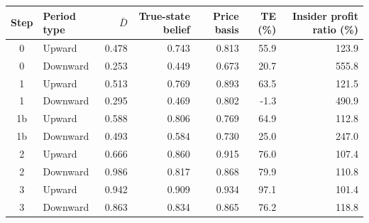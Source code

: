 \begin{tabular}{clrrrrr}
\toprule
Step & Period type & $\bar D$ & True-state belief & Price basis & TE (\%) & Insider profit ratio (\%) \\
\midrule
0 & Upward & 0.478 & 0.743 & 0.813 & 55.9 & 123.9 \\
0 & Downward & 0.253 & 0.449 & 0.673 & 20.7 & 555.8 \\
1 & Upward & 0.513 & 0.769 & 0.893 & 63.5 & 121.5 \\
1 & Downward & 0.295 & 0.469 & 0.802 & -1.3 & 490.9 \\
1b & Upward & 0.588 & 0.806 & 0.769 & 64.9 & 112.8 \\
1b & Downward & 0.493 & 0.584 & 0.730 & 25.0 & 247.0 \\
2 & Upward & 0.666 & 0.860 & 0.915 & 76.0 & 107.4 \\
2 & Downward & 0.986 & 0.817 & 0.868 & 79.9 & 110.8 \\
3 & Upward & 0.942 & 0.909 & 0.934 & 97.1 & 101.4 \\
3 & Downward & 0.863 & 0.834 & 0.865 & 76.2 & 118.8 \\
\bottomrule
\end{tabular}
